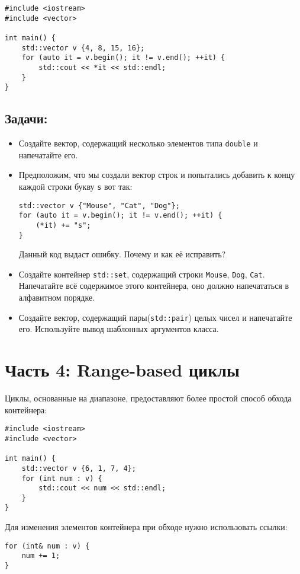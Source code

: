 \documentclass{article}
\begin{document}
\begin{lstlisting}
#include <iostream>
#include <vector>

int main() {
    std::vector v {4, 8, 15, 16};
    for (auto it = v.begin(); it != v.end(); ++it) {
    	std::cout << *it << std::endl;    
    }
}
\end{lstlisting}
\subsection*{Задачи:}
\begin{itemize}
\item Создайте вектор, содержащий несколько элементов типа \texttt{double} и напечатайте его.
\item Предположим, что мы создали вектор строк и попытались добавить к концу каждой строки букву \texttt{s} вот так:
\begin{lstlisting}
std::vector v {"Mouse", "Cat", "Dog"};
for (auto it = v.begin(); it != v.end(); ++it) {
    (*it) += "s";
}
\end{lstlisting}
Данный код выдаст ошибку. Почему и как её исправить?
\item Создайте контейнер \texttt{std::set}, содержащий строки \texttt{Mouse}, \texttt{Dog}, \texttt{Cat}. Напечатайте всё содержимое этого контейнера, оно должно напечататься в алфавитном порядке.

\item Создайте вектор, содержащий пары(\texttt{std::pair}) целых чисел и напечатайте его. Используйте вывод шаблонных аргументов класса.
\end{itemize}



\newpage
\section*{Часть 4: Range-based циклы}
Циклы, основанные на диапазоне, предоставляют более простой способ обхода контейнера:
\begin{lstlisting}
#include <iostream>
#include <vector>

int main() {
    std::vector v {6, 1, 7, 4};
    for (int num : v) {
    	std::cout << num << std::endl;    
    }
}
\end{lstlisting}
Для изменения элементов контейнера при обходе нужно использовать ссылки:
\begin{lstlisting}
for (int& num : v) {
    num += 1;    
}
\end{lstlisting}
\end{document}
